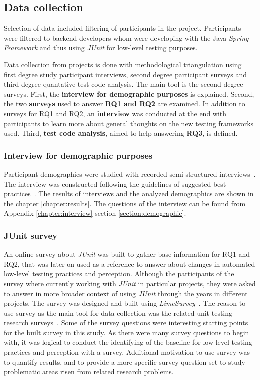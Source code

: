 \subsection{Data collection}
    Selection of data included filtering of participants in the project. Participants were filtered to backend developers
    whom were developing with the Java \textit{Spring Framework} and thus using \textit{JUnit}  for low-level testing purposes.

    Data collection from projects is done with methodological triangulation using first degree study participant interviews, second degree
    participant surveys and third degree quantative test code analysis. The main tool is the second degree surveys.
    First, the \textbf{interview for demographic purposes} is explained. Second, the two \textbf{surveys} used to answer
    \textbf{RQ1 and RQ2} are examined. In addition to surveys for RQ1 and RQ2, an \textbf{interview} was conducted at the end with participants to
    learn more about general thoughts on the new testing frameworks used.
    Third, \textbf{test code analysis}, aimed to help answering \textbf{RQ3}, is defined.

    \subsubsection{Interview for demographic purposes}
    Participant demographics were studied with recorded semi-structured interviews~\cite{cohen2006qualitative}.
    The interview was constructed following the guidelines of suggested best practices~\cite{kitchenham2002preliminary}.
    The results of interviews and the analyzed demographics are shown in the chapter
    \ref{chapter:results}. The questions of the interview can be found from Appendix \ref{chapter:interview} section
    \ref{section:demographic}.

    \subsubsection{JUnit survey}
    An online survey about \textit{JUnit} was built to gather base information for RQ1 and RQ2, that was
    later on used as a reference to answer about changes in automated low-level testing practices and perception. Although
    the participants of the survey where currently working with \textit{JUnit} in particular projects, they were asked to answer
    in more broader context of using \textit{JUnit} through the years in different projects.
    The survey was designed and built using \textit{LimeSurvey}~\cite{limesurvey}. The reason to use survey as the main tool for data collection
    was the related unit testing research surveys~\cite{williams2009effectiveness,daka2014survey,li2016automatically}.
    Some of the survey questions were interesting starting points
    for the built survey in this study. As there were many survey questions to begin with, it was logical to conduct the identifying
    of the baseline for low-level testing practices and perception with a survey. Additional motivation to use
    survey was to quantify results, and to provide a more specific survey question set to study problematic
    areas risen from related research problems.

